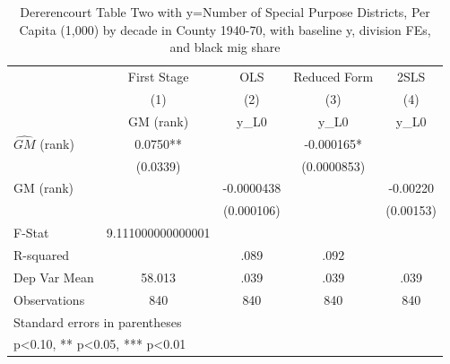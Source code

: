 \begin{table}[htbp]\centering
\def\sym#1{\ifmmode^{#1}\else\(^{#1}\)\fi}
\caption{Dererencourt Table Two with y=Number of Special Purpose Districts, Per Capita (1,000) by decade in County 1940-70, with baseline y, division FEs, and black mig share}
\begin{tabular}{l*{4}{c}}
\toprule
                    & First Stage   &         OLS   &Reduced Form   &        2SLS   \\
                    &\multicolumn{1}{c}{(1)}&\multicolumn{1}{c}{(2)}&\multicolumn{1}{c}{(3)}&\multicolumn{1}{c}{(4)}\\
                    &\multicolumn{1}{c}{GM  (rank)}&\multicolumn{1}{c}{y\_L0}&\multicolumn{1}{c}{y\_L0}&\multicolumn{1}{c}{y\_L0}\\
\midrule
$\hat{GM}$ (rank)   &      0.0750** &               &   -0.000165*  &               \\
                    &    (0.0339)   &               & (0.0000853)   &               \\
\addlinespace
GM  (rank)          &               &  -0.0000438   &               &    -0.00220   \\
                    &               &  (0.000106)   &               &   (0.00153)   \\
\midrule
F-Stat              &9.111000000000001   &               &               &               \\
R-squared           &               &        .089   &        .092   &               \\
Dep Var Mean        &      58.013   &        .039   &        .039   &        .039   \\
Observations        &         840   &         840   &         840   &         840   \\
\bottomrule
\multicolumn{5}{l}{\footnotesize Standard errors in parentheses}\\
\multicolumn{5}{l}{\footnotesize * p<0.10, ** p<0.05, *** p<0.01}\\
\end{tabular}
\end{table}

